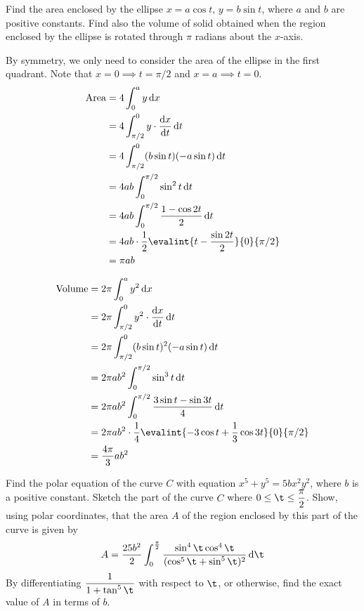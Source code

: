 \documentclass{echw}
\begin{document}

    \problem{}
        Find the area enclosed by the ellipse $x = a \cos t, \, y = b \sin t$, where $a$ and $b$ are positive constants. Find also the volume of solid obtained when the region enclosed by the ellipse is rotated through $\pi$ radians about the $x$-axis.

    \solution
        By symmetry, we only need to consider the area of the ellipse in the first quadrant. Note that $x = 0 \implies t = \pi/2$ and $x = a \implies t = 0$.
        \begin{align*}
            \area &= 4\int_0^a y \d x\\
            &= 4\int_{\pi/2}^0 y \cdot \der{x}{t} \d t\\
            &= 4\int_{\pi/2}^0 (b\sin t)(-a\sin t) \d t\\
            &= 4ab\int_0^{\pi/2} \sin^2 t \d t\\
            &= 4ab\int_0^{\pi/2} \dfrac{1 - \cos 2t}2 \d t\\
            &= 4ab \cdot \dfrac12 \evalint{t - \dfrac{\sin 2t}2}{0}{\pi/2}\\
            &= \pi ab
        \end{align*}


        \begin{align*}
            \volume &= 2\pi \int_0^a y^2 \d x\\
            &= 2\pi\int_{\pi/2}^0 y^2 \cdot \der{x}{t} \d t\\
            &= 2\pi\int_{\pi/2}^0 (b\sin t)^2 (-a\sin t) \d t\\
            &= 2\pi a b^2 \int_0^{\pi/2} \sin^3 t \d t\\
            &= 2\pi a b^2 \int_0^{\pi/2} \dfrac{3\sin t - \sin 3t}{4} \d t\\
            &= 2\pi a b^2 \cdot \dfrac14 \evalint{-3\cos t + \dfrac13 \cos 3t}{0}{\pi/2}\\
            &= \dfrac{4\pi}3 ab^2
        \end{align*}


    \problem{}
        Find the polar equation of the curve $C$ with equation $x^5 + y^5 = 5bx^2y^2$, where $b$ is a positive constant. Sketch the part of the curve $C$ where $0 \leq \t \leq \dfrac\pi2$. Show, using polar coordinates, that the area $A$ of the region enclosed by this part of the curve is given by
        \[
            A = \dfrac{25b^2}2 \int_0^{\frac\pi2} \dfrac{\sin^4\t\cos^4\t}{(\cos^5\t + \sin^5\t)^2} \d \t
        \]
        By differentiating $\dfrac1{1 + \tan^5\t}$ with respect to $\t$, or otherwise, find the exact value of $A$ in terms of $b$.
\end{document}
